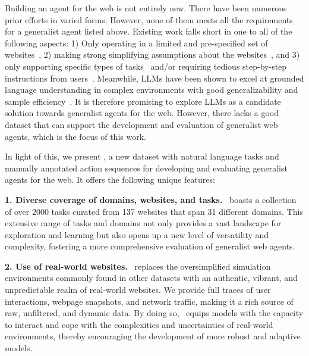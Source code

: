 Building an agent for the web is not entirely new.
There have been numerous prior efforts in varied forms. 
However, none of them meets all the requirements for a generalist agent listed above. 
Existing work falls short in one to all of the following aspects: 1) Only operating in a limited and pre-specified set of websites~\cite{yaoWebShopScalableRealWorld2022, sunMETAGUIMultimodalConversational2022, Liu2018ReinforcementLO, Li2020MappingNL, Burns2022ADF}, 2) making strong simplifying assumptions about the websites~\cite{Liu2018ReinforcementLO, yaoWebShopScalableRealWorld2022}, and 3) only supporting specific types of tasks~\cite{yaoWebShopScalableRealWorld2022, Li2020MappingNL, Liu2018ReinforcementLO} and/or requiring tedious step-by-step instructions from users~\cite{Liu2018ReinforcementLO, Xu2021GroundingOI, Li2020MappingNL, Burns2022ADF}. 
Meanwhile, LLMs have been shown to excel at grounded language understanding in complex environments with good generalizability and sample efficiency~\cite{pangu, SayCan, llm-planner, structgpt}.
It is therefore promising to explore LLMs as a candidate solution towards generalist agents for the web.
However, there lacks a good dataset that can support the development and evaluation of generalist web agents, which is the focus of this work.

In light of this, we present \mind, a new dataset with natural language tasks and manually annotated action sequences for developing and evaluating generalist agents for the web. 
It offers the following unique features:

\textbf{1. Diverse coverage of domains, websites, and tasks.} \mind\ boasts a collection of over \num{2000} tasks curated from \num{137} websites that span \num{31} different domains. This extensive range of tasks and domains not only provides a vast landscape for exploration and learning but also opens up a new level of versatility and complexity, fostering a more comprehensive evaluation of generalist web agents.

\textbf{2. Use of real-world websites.} \mind\ replaces the oversimplified simulation environments commonly found in other datasets with an authentic, vibrant, and unpredictable realm of real-world websites. We provide full traces of user interactions, webpage snapshots, and network traffic, making it a rich source of raw, unfiltered, and dynamic data. By doing so, \mind\ equips models with the capacity to interact and cope with the complexities and uncertainties of real-world environments, thereby encouraging the development of more robust and adaptive models.

